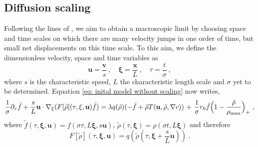 \documentclass[review,onefignum,onetabnum]{siamart220329}
\begin{document}
\subsection{Diffusion scaling} Following the lines of \cite{Hillen2009}, we aim to obtain a macroscopic limit by choosing space and time scales on which {there are many velocity jumps in one order of time, but small net displacements on this time scale}. To this aim, we define the dimensionless velocity, space and time variables as
$$
\mathbf{u} = \frac{\mathbf{v}}{s}\ , \quad \mathbf{\xi} = \frac{\mathbf{x}}{L}\ , \quad \tau = \frac{t}{\sigma}\ ,
$$
\noindent where $s$ is the characteristic speed, $L$ the characteristic length scale and $\sigma$ yet to be determined. Equation \cref{eq: inital model without scaling} now writes,
\begin{equation}
    {{\frac{1}{\sigma}}} \partial_\tau \tilde{f}+ \frac{s}{L} \mathbf{u} \cdot \nabla_\xi (F[\tilde{\rho}](\tau,\mathbf{\xi},\mathbf{u}) \tilde{f})= \lambda q(\tilde{\rho})(-\tilde{f}+\tilde{\rho} T(\mathbf{u},\tilde{\rho},\nabla c)){\ +\ \frac{1}{\sigma} r_0\tilde{f}\Bigl(1-\frac{\tilde{\rho}}{\rho_{\textnormal{max}}} \Bigr)_+}\ ,\label{eq: scaled model}
\end{equation}
\noindent where {{$\tilde{f}(\tau,\mathbf{\xi},\mathbf{u}) = f(\sigma \tau,L \mathbf{\xi} ,s \mathbf{u})$}}, $\tilde{\rho}(\tau,\mathbf{\xi}) = \rho(\sigma t,L \mathbf{\xi})$ and therefore 
$$
F[\tilde{\rho}](\tau,\mathbf{\xi},\mathbf{u}) = {{q(\tilde{\rho}(\tau, \mathbf{\xi} + \frac{s}{L} \mathbf{u}))}}\ .
$$
\end{document}
